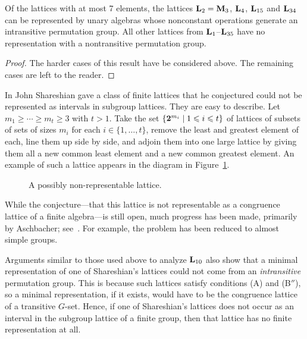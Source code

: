 \begin{theorem}
Of the lattices with at most 7 elements, the lattices
$\bL_2 = \bM_3$, $\bL_4$, $\bL_{15}$ and $\bL_{34}$ can be
represented by unary algebras whose nonconstant operations
generate an intransitive permutation group. All other
lattices from $\bL_1$--$\bL_{35}$ have no representation 
with a nontransitive permutation group.
\end{theorem}

\begin{proof}
The harder cases of this result have be considered above. The
remaining cases are left to the reader.
\end{proof}


In \cite{Shareshian2003} John Shareshian gave a class of finite 
lattices that he conjectured could not be represented as intervals 
in subgroup lattices. They are easy to describe. 
Let $m_1 \ge \cdots \ge m_t \ge 3$ with $t> 1$.
Take the set $\{\two^{m_i} \mid 1\leq i \leq t\}$ of 
lattices of subsets of sets of sizes $m_i$ for 
each $i\in \{1,\ldots,t\}$, remove
the least and greatest element of each, line them up side 
by side, and adjoin
them into one large lattice by giving them all a new common 
least element and a
new common greatest element.
An example of such a lattice appears in the diagram 
in Figure~\ref{fig:shareshian}.

\begin{figure}[htb]
\begin{center}
  \begin{tikzpicture}[scale=.8]
    
  \end{tikzpicture}
\end{center}
\caption{A possibly non-representable lattice.}\label{fig:shareshian}
\end{figure}
While the conjecture---that this lattice is not
representable as a congruence lattice of a finite algebra---is still open, much
progress has been made, primarily by Aschbacher; see~\cite{Aschbacher2013}.
For example, the problem has been reduced to almost simple groups.


Arguments similar to those used above to analyze $\bL_{10}$
also show that a minimal representation of one of Shareshian's
lattices could not come from an \emph{intransitive} permutation group.
This is because such lattices satisfy conditions (A) and (B$''$),
so a minimal representation, if it exists, would have to be
the congruence lattice of a transitive $G$-set.
Hence, if one of Shareshian's lattices does not occur as an
interval in the subgroup lattice of a finite group, then that lattice has
no finite representation at all.

